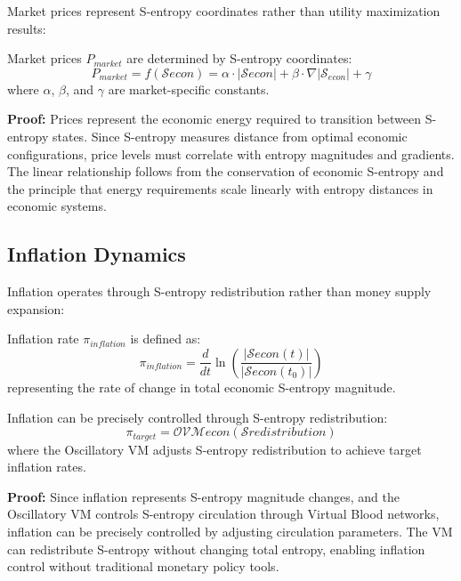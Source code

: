 Market prices represent S-entropy coordinates rather than utility maximization results:

\begin{theorem}
Market prices $P_{market}$ are determined by S-entropy coordinates:
\begin{equation}
P_{market} = f(\mathcal{S}{econ}) = \alpha \cdot |\mathcal{S}{econ}| + \beta \cdot \nabla|\mathcal{S}_{econ}| + \gamma
\end{equation}
where $\alpha$, $\beta$, and $\gamma$ are market-specific constants.

\textbf{Proof:}
Prices represent the economic energy required to transition between S-entropy states. Since S-entropy measures distance from optimal economic configurations, price levels must correlate with entropy magnitudes and gradients. The linear relationship follows from the conservation of economic S-entropy and the principle that energy requirements scale linearly with entropy distances in economic systems.
\end{theorem}

\subsection{Inflation Dynamics}

Inflation operates through S-entropy redistribution rather than money supply expansion:

\begin{definition}
Inflation rate $\pi_{inflation}$ is defined as:
\begin{equation}
\pi_{inflation} = \frac{d}{dt} \ln\left(\frac{|\mathcal{S}{econ}(t)|}{|\mathcal{S}{econ}(t_0)|}\right)
\end{equation}
representing the rate of change in total economic S-entropy magnitude.
\end{definition}

\begin{theorem}
Inflation can be precisely controlled through S-entropy redistribution:
\begin{equation}
\pi_{target} = \mathcal{OVM}{econ}(\mathcal{S}{redistribution})
\end{equation}
where the Oscillatory VM adjusts S-entropy redistribution to achieve target inflation rates.

\textbf{Proof:}
Since inflation represents S-entropy magnitude changes, and the Oscillatory VM controls S-entropy circulation through Virtual Blood networks, inflation can be precisely controlled by adjusting circulation parameters. The VM can redistribute S-entropy without changing total entropy, enabling inflation control without traditional monetary policy tools.
\end{theorem}

